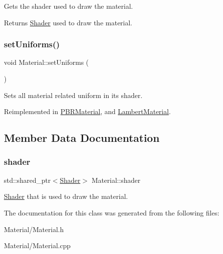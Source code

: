 Gets the shader used to draw the material.

\begin{DoxyReturn}{Returns}
\mbox{\hyperlink{class_shader}{Shader}} used to draw the material. 
\end{DoxyReturn}
\mbox{\label{class_material_a793da829d1f2daf3f3317d9b495f8b26}} 
\subsubsection{\texorpdfstring{setUniforms()}{setUniforms()}}
{\footnotesize\ttfamily void Material\+::set\+Uniforms (\begin{DoxyParamCaption}{ }\end{DoxyParamCaption})\hspace{0.3cm}{\ttfamily [virtual]}}

Sets all material related uniform in its shader. 

Reimplemented in \mbox{\hyperlink{class_p_b_r_material_ae8cabaa3a19fc6787233f2f06b1d058e}{P\+B\+R\+Material}}, and \mbox{\hyperlink{class_lambert_material_a2983e583790ba13a782dc49d78358bb7}{Lambert\+Material}}.



\subsection{Member Data Documentation}
\mbox{\label{class_material_a2528e7055a949798de91d54c259faf1e}} 
\subsubsection{\texorpdfstring{shader}{shader}}
{\footnotesize\ttfamily std\+::shared\+\_\+ptr$<$\mbox{\hyperlink{class_shader}{Shader}}$>$ Material\+::shader\hspace{0.3cm}{\ttfamily [protected]}}

\mbox{\hyperlink{class_shader}{Shader}} that is used to draw the material. 

The documentation for this class was generated from the following files\+:\begin{DoxyCompactItemize}
\item 
Material/Material.\+h\item 
Material/Material.\+cpp\end{DoxyCompactItemize}
